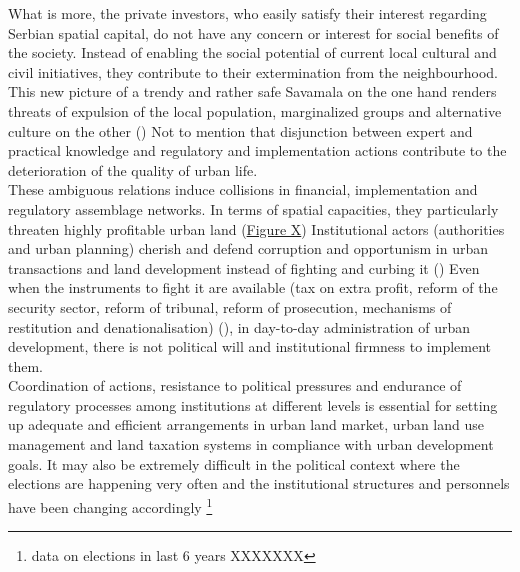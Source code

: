 \documentclass[11pt]{report}
\begin{document}
What is more, the private investors, who easily satisfy their interest regarding Serbian spatial capital, do not have any concern or interest for social benefits of the society. Instead of enabling the social potential of current local cultural and civil initiatives, they contribute to their extermination from the neighbourhood.
This new picture of a trendy and rather safe Savamala on the one hand renders threats of expulsion of the local population, marginalized groups and alternative culture on the other
(\href{Krusche}{\cite{krusche_bureau_2015}})
Not to mention that disjunction between expert and practical knowledge and regulatory and implementation actions contribute to the deterioration of the quality of urban life.
\\

These ambiguous relations induce collisions in financial, implementation and regulatory assemblage networks. In terms of spatial capacities, they particularly threaten highly profitable urban land (\href{FigureX}{Figure X})
Institutional actors (authorities and urban planning) cherish and defend corruption and opportunism in urban transactions and land development instead of fighting and curbing it (\href{NedovicBudic}{\cite{nedovic-budic_mornings_2011}})
Even when the instruments to fight it are available (tax on extra profit, reform of the security sector, reform of tribunal, reform of prosecution, mechanisms of restitution and denationalisation) (\href{Vujosevic}{\cite{vujosevic_postsocijalisticka_2010}}),
in day-to-day administration of urban
development, there is not political will and institutional firmness to implement them.
\\

Coordination of actions, resistance to political pressures and endurance of regulatory processes among institutions at different levels is essential for setting up adequate and efficient arrangements in urban land market, urban land use management and land taxation systems in compliance with urban development goals.
It may also be extremely difficult in the political context where the elections are happening very often and the institutional structures and personnels have been changing accordingly
\footnote{data on elections in last 6 years XXXXXXX}
\\
\end{document}
